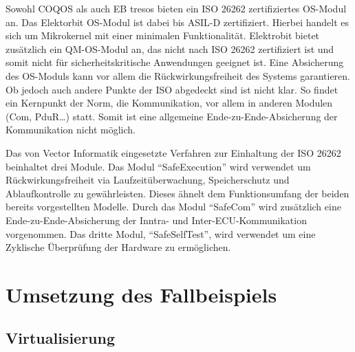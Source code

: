 \documentclass[
  a4paper,					    %
  twoside,
  DIV=calc,     				%
  bibliography=totoc,
  cleardoublepage=empty,
  ngerman,     					%
  final       					%
]{scrbook}
\begin{document}
Sowohl COQOS als auch EB tresos bieten ein ISO 26262 zertifiziertes OS-Modul an. Das Elektorbit OS-Modul ist dabei bis ASIL-D zertifiziert. Hierbei handelt es sich um Mikrokernel mit einer minimalen Funktionalität. Elektrobit bietet zusätzlich ein QM-OS-Modul an, das nicht nach ISO 26262 zertifiziert ist und somit nicht für sicherheitskritische Anwendungen geeignet ist. Eine Absicherung des OS-Moduls kann vor allem die Rückwirkungsfreiheit des Systems garantieren. Ob jedoch auch andere Punkte der ISO abgedeckt sind ist nicht klar. So findet ein Kernpunkt der Norm, die Kommunikation, vor allem in anderen Modulen (Com, PduR\dots) statt. Somit ist eine allgemeine Ende-zu-Ende-Absicherung der Kommunikation nicht möglich.

Das von Vector Informatik eingesetzte Verfahren zur Einhaltung der ISO 26262 beinhaltet drei Module. Das Modul "`SafeExecution"' wird verwendet um Rückwirkungsfreiheit via Laufzeitüberwachung, Speicherschutz und Ablaufkontrolle zu gewährleisten. Dieses ähnelt dem Funktionsumfang der beiden bereits vorgestellten Modelle. Durch das Modul "`SafeCom"' wird zusätzlich eine Ende-zu-Ende-Absicherung der Inntra- und Inter-ECU-Kommunikation vorgenommen. Das dritte Modul, "`SafeSelfTest"', wird verwendet um eine Zyklische Überprüfung der Hardware zu ermöglichen.









\chapter{Umsetzung des Fallbeispiels}
\label{sec:Umsetzung_Fallbeispiel}







\section{Virtualisierung}
\label{sec:Virtualisierung_Umgesetzt}
\end{document}
